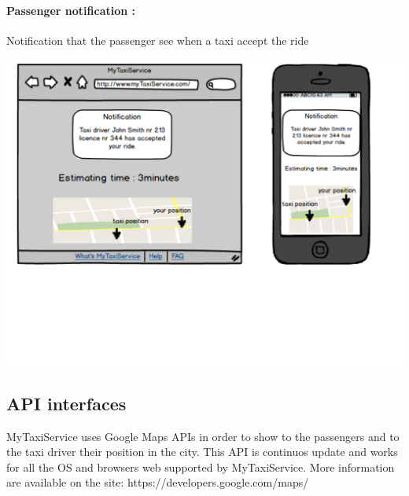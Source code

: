 \paragraph{Passenger notification :}
Notification that the passenger see when a taxi accept the ride
\begin{center}
	\includegraphics[width=\textwidth]{mockup/PassengerNotification.pdf}
\end{center}

\subsection{API interfaces}
MyTaxiService uses Google Maps APIs in order to show to the passengers and to the taxi driver their position in the city.
This API is continuos update and works for all the OS and browsers web supported by MyTaxiService.
More information are available on the site: https://developers.google.com/maps/

